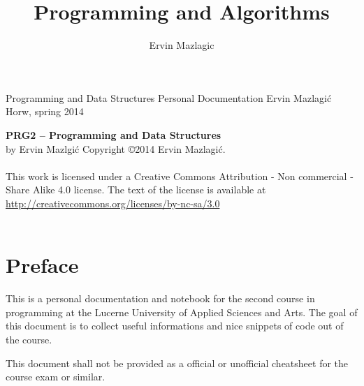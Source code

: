 \documentclass[a4paper,
               10pt,
               fleqn]{article}
\author{Ervin Mazlagic}
\title{Programming and Algorithms}
\begin{document}
	 {Programming and Data Structures}
         {Personal Documentation}
         {Ervin Mazlagi\'c}
         {Horw, spring 2014}

\newpage
\thispagestyle{empty}
\noindent
\textbf{PRG2 -- Programming and Data Structures} \\
by Ervin Mazlgi\'c
\vfill{}
\noindent
Copyright \copyright 2014  Ervin Mazlagi\'c. \\\\
This work is licensed under a Creative Commons Attribution - Non 
commercial - Share Alike 4.0 license.
The text of the license is available at 
\url{http://creativecommons.org/licenses/by-nc-sa/3.0} \\\\
{\huge \ccbysa}
\vfill{}

\newpage

\section*{Preface}
This is a personal documentation and notebook for the second course in 
programming at the Lucerne University of Applied Sciences and Arts.
The goal of this document is to collect useful informations and nice
snippets of code out of the course.

This document shall not be provided as a official or unofficial 
cheatsheet for the course exam or similar.
\end{document}
